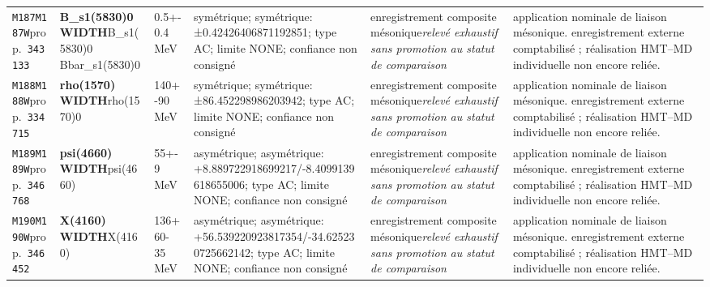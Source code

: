 \begin{landscape}
\begin{longtable}{L{1.85cm}L{4.45cm}L{2.35cm}L{4.05cm}L{3.35cm}L{7.15cm}}
\texttt{M187}\newline \texttt{M187W}\newline prop.\ \texttt{343133} & \textbf{B\_\allowbreak{}s1(5830)0 WIDTH}\newline B\_\allowbreak{}s1(5830)0 \textbar{}\allowbreak{} Bbar\_\allowbreak{}s1(5830)0 & 0.5+-0.4\,MeV & symétrique; symétrique: ±0.42426406871192851; type AC; limite NONE; confiance non consigné & enregistrement composite mésonique\newline \emph{relevé exhaustif sans promotion au statut de comparaison} & application nominale de liaison mésonique. enregistrement externe comptabilisé ; réalisation HMT--MD individuelle non encore reliée. \\
\texttt{M188}\newline \texttt{M188W}\newline prop.\ \texttt{334715} & \textbf{rho(1570) WIDTH}\newline rho(1570)0 & 140+-90\,MeV & symétrique; symétrique: ±86.452298986203942; type AC; limite NONE; confiance non consigné & enregistrement composite mésonique\newline \emph{relevé exhaustif sans promotion au statut de comparaison} & application nominale de liaison mésonique. enregistrement externe comptabilisé ; réalisation HMT--MD individuelle non encore reliée. \\
\texttt{M189}\newline \texttt{M189W}\newline prop.\ \texttt{346768} & \textbf{psi(4660) WIDTH}\newline psi(4660) & 55+-9\,MeV & asymétrique; asymétrique: +8.889722918699217/-8.4099139618655006; type AC; limite NONE; confiance non consigné & enregistrement composite mésonique\newline \emph{relevé exhaustif sans promotion au statut de comparaison} & application nominale de liaison mésonique. enregistrement externe comptabilisé ; réalisation HMT--MD individuelle non encore reliée. \\
\texttt{M190}\newline \texttt{M190W}\newline prop.\ \texttt{346452} & \textbf{X(4160) WIDTH}\newline X(4160) & 136+60-35\,MeV & asymétrique; asymétrique: +56.539220923817354/-34.625230725662142; type AC; limite NONE; confiance non consigné & enregistrement composite mésonique\newline \emph{relevé exhaustif sans promotion au statut de comparaison} & application nominale de liaison mésonique. enregistrement externe comptabilisé ; réalisation HMT--MD individuelle non encore reliée. \\

\end{longtable}
\end{landscape}
